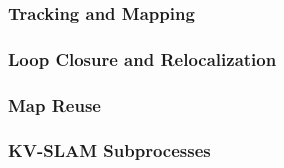 \subsubsection{Tracking and Mapping}

\subsubsection{Loop Closure and Relocalization}

\subsubsection{Map Reuse}

\subsubsection{KV-SLAM Subprocesses}